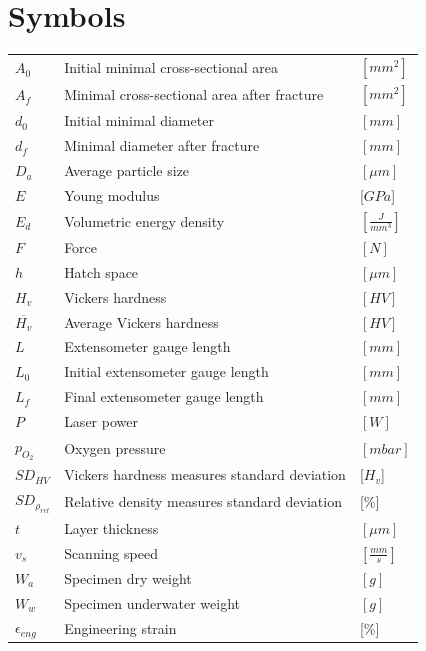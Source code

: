 \documentclass[
11pt, %
british, %
singlespacing, %
headsepline, %
]{MastersDoctoralThesis} %
\begin{document}

\chapter*{Symbols}%
\begin{tabular}{lll}

\centering

$A_0$ & Initial minimal cross-sectional area & $[mm^2]$\\
$A_f$ & Minimal cross-sectional area after fracture & $[mm^2]$\\
$d_0$ & Initial minimal diameter & $[mm]$\\ 
$d_f$ & Minimal diameter after fracture& $[mm]$\\ 
$D_a$ & Average particle size & $[\mu m]$\\ 
$E$ & Young modulus & [$GPa$]\\
$E_d$ & Volumetric energy density & $[\frac{J}{mm^3}]$\\
$F$ & Force &$ [N] $\\
$h$ & Hatch space & $[\mu m]$\\
$H_v$ & Vickers hardness & $[HV]$\\
$\overline{H_v}$ & Average Vickers hardness & $[HV]$\\
$L$ & Extensometer gauge length & $[mm]$\\
$L_0$ & Initial extensometer gauge length &$[mm]$\\
$L_f$ & Final extensometer gauge length &$[mm]$\\
$P$ & Laser power & $[W]$ \\
$p_{O_2}$ & Oxygen pressure & $[mbar]$\\
$SD_{HV}$ & Vickers hardness measures standard deviation & [$H_v$]\\
$SD_{\rho_{rel}}$ & Relative density measures standard deviation & [$\%$]\\
$t$ & Layer thickness & $[\mu m]$\\
$v_s$ & Scanning speed & $[\frac{mm}{s}]$ \\
$W_a$ & Specimen dry weight& $ [g]$ \\
$W_w$ & Specimen underwater weight & $[g]$\\
\addlinespace
\addlinespace
$\epsilon_{eng}$ & Engineering strain & [\%]\\

\end{tabular}
\end{document}
